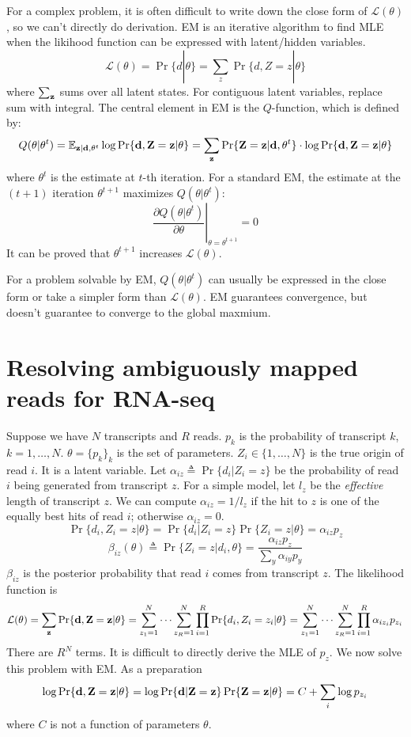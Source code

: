 \documentclass[10pt]{article}
\begin{document}
For a complex problem, it is often difficult to write down the close form of
$\mathcal{L}(\theta)$, so we can't directly do derivation. EM is an iterative
algorithm to find MLE when the likihood function can be expressed with
latent/hidden variables.
$$
\mathcal{L}(\theta)=\Pr\{d|\theta\}=\sum_z\Pr\{d,Z=z|\theta\}
$$
where $\sum_{\bf z}$ sums over all latent states. For contiguous latent
variables, replace sum with integral. The central element in EM is the
$Q$-function, which is defined by:
$$
Q(\theta|\theta^t)=\mathbb{E}_{{\bf z}|{\bf d},\theta^t}\log\Pr\{{\bf d},{\bf Z}={\bf z}|\theta\}=\sum_{{\bf z}}\Pr\{{\bf Z}={\bf z}|{\bf d},\theta^t\}\cdot\log\Pr\{{\bf d},{\bf Z}={\bf z}|\theta\}
$$
where $\theta^t$ is the estimate at $t$-th iteration. For a standard EM, the
estimate at the $(t+1)$ iteration $\theta^{t+1}$ maximizes $Q(\theta|\theta^t)$:
$$
\left.\frac{\partial Q(\theta|\theta^t)}{\partial\theta}\right|_{\theta=\theta^{t+1}}=0
$$
It can be proved that $\theta^{t+1}$ increases $\mathcal{L}(\theta)$.

For a problem solvable by EM, $Q(\theta|\theta^t)$ can usually be expressed in
the close form or take a simpler form than $\mathcal{L}(\theta)$. EM guarantees
convergence, but doesn't guarantee to converge to the global maxmium.

\newpage

\section{Resolving ambiguously mapped reads for RNA-seq}

Suppose we have $N$ transcripts and $R$ reads. $p_k$ is the probability of
transcript $k$, $k=1,\ldots,N$. $\theta=\{p_k\}_k$ is the set of parameters.
$Z_i\in\{1,\ldots,N\}$ is the true origin of read $i$. It is a latent variable.
Let $\alpha_{iz}\triangleq\Pr\{d_i|Z_i=z\}$ be the probability of read $i$
being generated from transcript $z$. For a simple model, let $l_z$ be the
\emph{effective} length of transcript $z$. We can compute $\alpha_{iz}=1/l_z$
if the hit to $z$ is one of the equally best hits of read $i$; otherwise
$\alpha_{iz}=0$.
\[
\Pr\{d_i,Z_i=z|\theta\}=\Pr\{d_i|Z_i=z\}\Pr\{Z_i=z|\theta\}=\alpha_{iz}p_z
\]
\[
\beta_{iz}(\theta)\triangleq\Pr\{Z_i=z|d_i,\theta\}=\frac{\alpha_{iz}p_z}{\sum_{y}\alpha_{iy}p_y}
\]
$\beta_{iz}$ is the posterior probability that read $i$ comes from transcript
$z$. The likelihood function is
$$
\mathcal{L}(\theta)=\sum_{\bf z}\Pr\{{\bf d},{\bf Z}={\bf z}|\theta\}=\sum_{z_1=1}^N\cdots\sum_{z_R=1}^N\prod_{i=1}^R\Pr\{d_i,Z_i=z_i|\theta\}
=\sum_{z_1=1}^N\cdots\sum_{z_R=1}^N\prod_{i=1}^R\alpha_{iz_i}p_{z_i}
$$
There are $R^N$ terms. It is difficult to directly derive the MLE of $p_z$.
We now solve this problem with EM. As a preparation
\[
\log\Pr\{{\bf d},{\bf Z}={\bf z}|\theta\}=\log\Pr\{{\bf d}|{\bf Z}={\bf z}\}\Pr\{{\bf Z}={\bf z}|\theta\}=C+\sum_i\log p_{z_i}
\]
where $C$ is not a function of parameters $\theta$.
\end{document}
